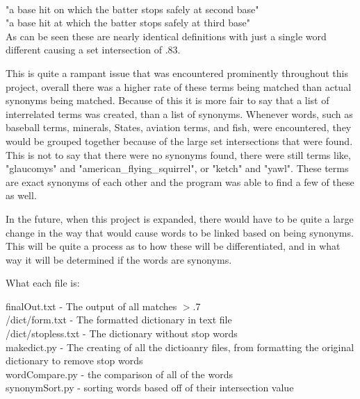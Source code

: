 \documentclass{article}
\begin{document}
\begin{addmargin}[4em]{4em}
\\"a base hit on which the batter stops safely at second base"
\\"a base hit at which the batter stops safely at third base" 
\\As can be seen these are nearly identical definitions with just a single word different causing a set intersection of .83. 
\par This is quite a rampant issue that was encountered prominently throughout this project, overall there was a higher rate of these terms being matched than actual synonyms being matched. Because of this it is more fair to say that a list of interrelated terms was created, than a list of synonyms. Whenever words, such as baseball terms, minerals, States, aviation terms, and fish, were encountered, they would be grouped together because of the large set intersections that were found. This is not to say that there were no synonyms found, there were still terms like, "glaucomys" and "american\_flying\_squirrel", or "ketch" and "yawl". These terms are exact synonyms of each other and the program was able to find a few of these as well.
\par In the future, when this project is expanded, there would have to be quite a large change in the way that would cause words to be linked based on being synonyms. This will be quite a process as to how these will be differentiated, and in what way it will be determined if the words are synonyms.
\end{addmargin}
What each file is:
\begin{addmargin}[4em]{4em}
finalOut.txt - The output of all matches $>$.7\\
/dict/form.txt - The formatted dictionary in text file\\
/dict/stopless.txt - The dictionary without stop words\\
makedict.py - The creating of all the dictioanry files, from formatting the original dictionary to remove stop words\\
wordCompare.py - the comparison of all of the words\\
synonymSort.py - sorting words based off of their intersection value\\
\end{addmargin}
\end{document}
